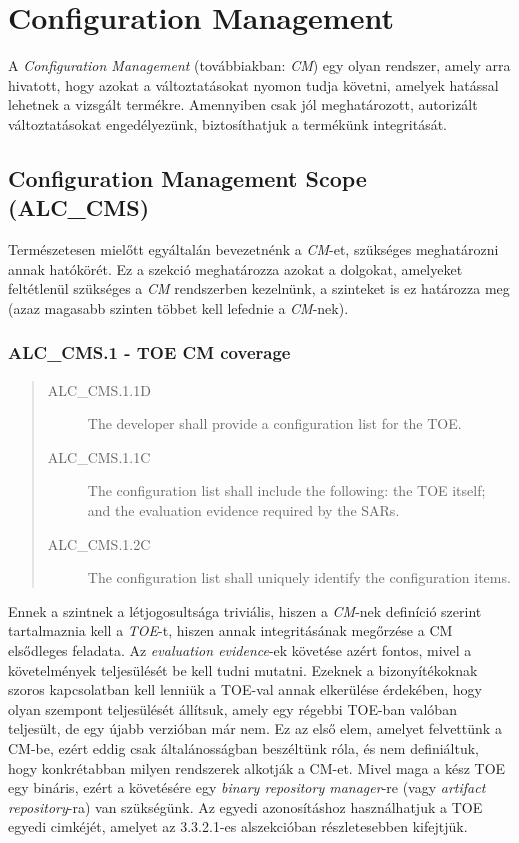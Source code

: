 \pagebreak[3]
\section{Configuration Management}
A \emph{Configuration Management} (továbbiakban: \emph{CM}) egy olyan rendszer, amely arra hivatott,
hogy azokat a változtatásokat nyomon tudja követni, amelyek hatással lehetnek a vizsgált termékre.
Amennyiben csak jól meghatározott, autorizált változtatásokat engedélyezünk, biztosíthatjuk a
termékünk integritását.

\subsection{Configuration Management Scope (ALC\_CMS)}
Természetesen mielőtt egyáltalán bevezetnénk a \emph{CM}-et, szükséges meghatározni annak hatókörét.
Ez a szekció meghatározza azokat a dolgokat, amelyeket feltétlenül szükséges a \emph{CM} rendszerben
kezelnünk, a szinteket is ez határozza meg (azaz magasabb szinten többet kell lefednie
a \emph{CM}-nek).

\pagebreak[3]
\subsubsection{ALC\_CMS.1 - TOE CM coverage}
\begin{quote}
    \begin{description}
        \item[ALC\_CMS.1.1D]{The developer shall provide a configuration list for the TOE.}
        \item[ALC\_CMS.1.1C]{The configuration list shall include the following: the TOE itself; and
            the evaluation evidence required by the SARs.}
        \item[ALC\_CMS.1.2C]{The configuration list shall uniquely identify the configuration
            items.}
    \end{description}
\end{quote}

Ennek a szintnek a létjogosultsága triviális, hiszen a \emph{CM}-nek definíció szerint tartalmaznia
kell a \emph{TOE}-t, hiszen annak integritásának megőrzése a CM elsődleges feladata. Az
\emph{evaluation evidence}-ek követése azért fontos, mivel a követelmények teljesülését be kell
tudni mutatni. Ezeknek a bizonyítékoknak szoros kapcsolatban kell lenniük a TOE-val annak elkerülése
érdekében, hogy olyan szempont teljesülését állítsuk, amely egy régebbi TOE-ban valóban teljesült,
de egy újabb verzióban már nem.
Ez az első elem, amelyet felvettünk a CM-be, ezért eddig csak általánosságban beszéltünk róla,
és nem definiáltuk, hogy konkrétabban milyen rendszerek alkotják a CM-et.  Mivel maga a kész TOE egy
bináris, ezért a követésére egy \emph{binary repository manager}-re (vagy \emph{artifact
repository}-ra) van szükségünk. Az egyedi azonosításhoz használhatjuk a TOE egyedi cimkéjét, amelyet
az 3.3.2.1-es alszekcióban részletesebben kifejtjük.

